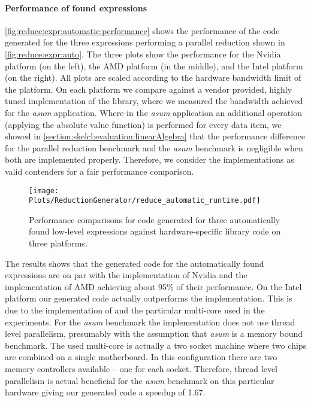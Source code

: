 \paragraph{Performance of found expressions}
\autoref{fig:reduce:expr:automatic:performance} shows the performance of the code generated for the three expressions performing a parallel reduction shown in \autoref{fig:reduce:expr:auto}.
The three plots show the performance for the Nvidia platform (on the left), the AMD platform (in the middle), and the Intel platform (on the right).
All plots are scaled according to the hardware bandwidth limit of the platform.
On each platform we compare against a vendor provided, highly tuned implementation of the \BLAS library, where we measured the bandwidth achieved for the \emph{asum} application.
Where in the \emph{asum} application an additional operation (applying the absolute value function) is performed for every data item, we showed in \autoref{section:skelcl:evaluation:linearAlgebra} that the performance difference for the parallel reduction benchmark and the \emph{asum} benchmark is negligible when both are implemented properly.
Therefore, we consider the \BLAS implementations as valid contenders for a fair performance comparison.

\begin{figure}
  \centering
  \texttt{[image: Plots/ReductionGenerator/reduce\_automatic\_runtime.pdf]}
  \caption{Performance comparisons for code generated for three automatically found low-level expressions against hardware-specific library code on three platforms.}
  \label{fig:reduce:expr:automatic:performance}
\end{figure}

The results shows that the generated code for the automatically found expressions are on par with the \CUBLAS implementation of Nvidia and the \clBLAS implementation of AMD achieving about 95\% of their performance.
On the Intel platform our generated code actually outperforms the \MKL implementation.
This is due to the implementation of \MKL and the particular multi-core \CPU used in the experiments.
For the \emph{asum} benchmark the \MKL implementation does not use thread level parallelism, presumably with the assumption that \emph{asum} is a memory bound benchmark.
The used multi-core \CPU is actually a two socket machine where two chips are combined on a single motherboard.
In this configuration there are two memory controllers available -- one for each socket.
Therefore, thread level parallelism is actual beneficial for the \emph{asum} benchmark on this particular hardware giving our generated code a speedup of 1.67.

